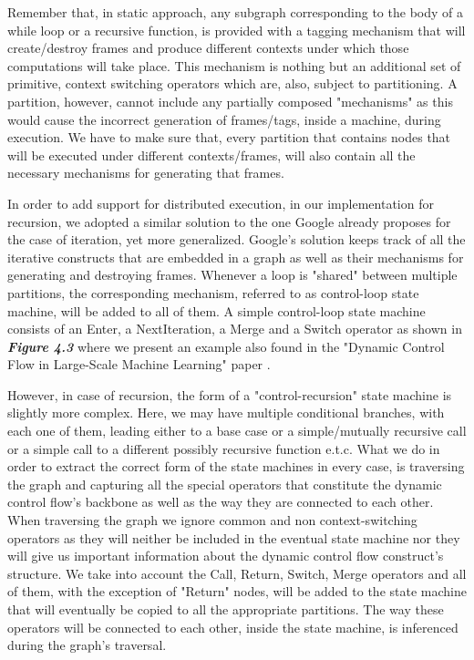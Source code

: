 \documentclass[ack,preface]{dithesis}
\begin{document}
Remember that, in static approach, any subgraph corresponding to the body of a while loop or a recursive function, is provided with a tagging mechanism that will create/destroy frames and produce different contexts under which those computations will take place. This mechanism is nothing but an additional set of primitive, context switching operators which are, also, subject to partitioning. A partition, however, cannot include any partially composed "mechanisms" as this would cause the incorrect generation of frames/tags, inside a machine, during execution. We have to make sure that, every partition that contains nodes that will be executed under different contexts/frames, will also contain all the necessary mechanisms for generating that frames.

In order to add support for distributed execution, in our implementation for recursion, we adopted a similar solution to the one Google already proposes for the case of iteration, yet more generalized. Google's solution keeps track of all the iterative constructs that are embedded in a graph as well as their mechanisms for generating and destroying frames. Whenever a loop is "shared" between multiple partitions, the corresponding mechanism, referred to as control-loop state machine,  will be added to all of them. A simple control-loop state machine consists of an Enter, a NextIteration, a Merge and a Switch operator as shown in  \textit{\textbf{Figure 4.3}} where we present an example also found in the "Dynamic Control Flow in Large-Scale Machine Learning" paper \cite{Yu:2018}.

However, in case of recursion, the form of a "control-recursion" state machine is slightly more complex. Here, we may have multiple conditional branches, with each one of them, leading either to a base case or a simple/mutually recursive call or a simple call to a different possibly recursive function e.t.c. What we do in order to extract the correct form of the state machines in every case, is traversing the graph and capturing all the special operators that constitute the dynamic control flow's backbone as well as the way they are connected to each other. When traversing the graph we ignore common and non context-switching operators as they will neither be included in the eventual state machine nor they will give us important information about the dynamic control flow construct's structure. We take into account the Call, Return, Switch, Merge operators and all of them, with the exception of "Return" nodes, will be added to the state machine that will eventually  be copied to all the appropriate partitions. The way these operators will be connected to each other, inside the state machine, is inferenced during the graph's traversal.
\end{document}
